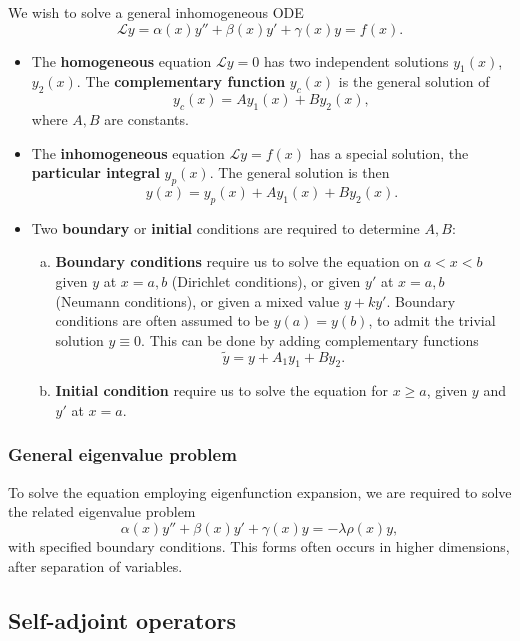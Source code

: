 \documentclass[12pt]{article}
\begin{document}
We wish to solve a general inhomogeneous ODE
\[
	\mathcal{L}y = \alpha(x) y'' + \beta(x) y' + \gamma(x) y = f(x)
.\]
\begin{itemize}
	\item The \textbf{homogeneous} equation $\mathcal{L} y = 0$ has two independent solutions $y_1(x)$, $y_2(x)$. The \textbf{complementary function} $y_c(x)$ is the general solution of
		\[
			y_c(x) = A y_1(x) +B y_2(x)
		,\]
		where $A, B$ are constants.
	\item The \textbf{inhomogeneous} equation $\mathcal{L}y = f(x)$ has a special solution, the \textbf{particular integral} $y_p(x)$. The general solution is then
		\[
			y(x) = y_p(x) + Ay_1(x) + By_2(x)
		.\]
	\item Two \textbf{boundary} or \textbf{initial} conditions are required to determine $A, B$:
		\begin{enumerate}[(a)]
			\item \textbf{Boundary conditions} require us to solve the equation on $a < x < b$ given $y$ at $x = a, b$ (Dirichlet conditions), or given $y'$ at $x = a, b$ (Neumann conditions), or given a mixed value $y + ky'$. Boundary conditions are often assumed to be $y(a) = y(b)$, to admit the trivial solution $y \equiv 0$. This can be done by adding complementary functions
				\[
				\tilde y = y + A_1 y_1 + B y_2
				.\]
			\item \textbf{Initial condition} require us to solve the equation for $x \geq a$, given $y$ and $y'$ at $x = a$.
		\end{enumerate}
		
\end{itemize}

\subsubsection{General eigenvalue problem}%
\label{subsub:general_eigenvalue_problem}

To solve the equation employing eigenfunction expansion, we are required to solve the related eigenvalue problem
\[
	\alpha(x) y'' + \beta(x) y' + \gamma(x) y = - \lambda \rho(x) y
,\]
with specified boundary conditions. This forms often occurs in higher dimensions, after separation of variables.

\subsection{Self-adjoint operators}%
\label{sub:self_adjoint_operators}
\end{document}
